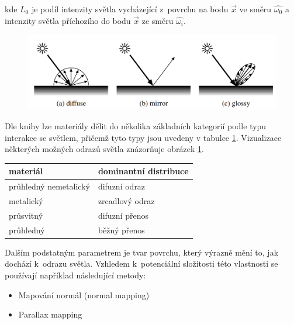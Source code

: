 kde $L_0$ je podíl intenzity světla vycházející z~povrchu na bodu $\vec{x}$ ve směru $\hat{\omega_0}$ a intenzity světla příchozího do bodu $\vec{x}$ ze směru $\hat{\omega_i}$.

\begin{figure}[H]
	\centering
	\includegraphics[scale=1]{obrazky-figures/reflection_types.png}
	\captionsetup{justification=centering}
	\label{fig:refl_types}
\end{figure}

Dle knihy \cite{hunter_harold_1987} lze materiály dělit do několika základních kategorií podle typu interakce se světlem, přičemž tyto typy jsou uvedeny v tabulce \ref{tab:mats_distr}. Vizualizace některých možných odrazů světla znázorňuje obrázek \ref{fig:refl_types}.

\begin{table}[H]
	\centering
	\begin{tabular}{|l|l|}
		\hline
		materiál              & dominantní distribuce \\ \hline
		průhledný nemetalický & difuzní odraz         \\ \hline
		metalický             & zrcadlový odraz       \\ \hline
		průsvitný             & difuzní přenos        \\ \hline
		průhledný             & běžný přenos          \\ \hline
	\end{tabular}
	\captionsetup{justification=centering}
	\label{tab:mats_distr}
\end{table}


Dalším podstatným parametrem je tvar povrchu, který výrazně mění to, jak dochází k~odrazu světla. Vzhledem k~potenciální složitosti této vlastnosti se používají například následující metody:

\begin{itemize}
	\item Mapování normál (normal mapping)
	\item Parallax mapping
\end{itemize}

